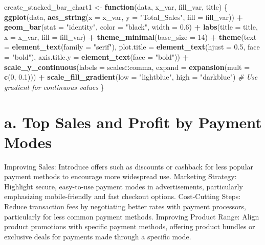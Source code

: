 \documentclass[
]{article}
\newenvironment{Shaded}{\begin{snugshade}}{\end{snugshade}}
\newcommand{\AttributeTok}[1]{\textcolor[rgb]{0.13,0.29,0.53}{#1}}
\newcommand{\CommentTok}[1]{\textcolor[rgb]{0.56,0.35,0.01}{\textit{#1}}}
\newcommand{\ControlFlowTok}[1]{\textcolor[rgb]{0.13,0.29,0.53}{\textbf{#1}}}
\newcommand{\DecValTok}[1]{\textcolor[rgb]{0.00,0.00,0.81}{#1}}
\newcommand{\FloatTok}[1]{\textcolor[rgb]{0.00,0.00,0.81}{#1}}
\newcommand{\FunctionTok}[1]{\textcolor[rgb]{0.13,0.29,0.53}{\textbf{#1}}}
\newcommand{\NormalTok}[1]{#1}
\newcommand{\OtherTok}[1]{\textcolor[rgb]{0.56,0.35,0.01}{#1}}
\newcommand{\SpecialCharTok}[1]{\textcolor[rgb]{0.81,0.36,0.00}{\textbf{#1}}}
\newcommand{\StringTok}[1]{\textcolor[rgb]{0.31,0.60,0.02}{#1}}
\begin{document}
\begin{Shaded}
\begin{Highlighting}[]
\NormalTok{create\_stacked\_bar\_chart1 }\OtherTok{\textless{}{-}} \ControlFlowTok{function}\NormalTok{(data, x\_var, fill\_var, title) \{}
  \FunctionTok{ggplot}\NormalTok{(data, }\FunctionTok{aes\_string}\NormalTok{(}\AttributeTok{x =}\NormalTok{ x\_var, }\AttributeTok{y =} \StringTok{"Total\_Sales"}\NormalTok{, }\AttributeTok{fill =}\NormalTok{ fill\_var)) }\SpecialCharTok{+} 
    \FunctionTok{geom\_bar}\NormalTok{(}\AttributeTok{stat =} \StringTok{"identity"}\NormalTok{, }\AttributeTok{color =} \StringTok{"black"}\NormalTok{, }\AttributeTok{width =} \FloatTok{0.6}\NormalTok{) }\SpecialCharTok{+} 
    \FunctionTok{labs}\NormalTok{(}\AttributeTok{title =}\NormalTok{ title, }\AttributeTok{x =}\NormalTok{ x\_var, }\AttributeTok{fill =}\NormalTok{ fill\_var) }\SpecialCharTok{+} 
    \FunctionTok{theme\_minimal}\NormalTok{(}\AttributeTok{base\_size =} \DecValTok{14}\NormalTok{) }\SpecialCharTok{+}
    \FunctionTok{theme}\NormalTok{(}\AttributeTok{text =} \FunctionTok{element\_text}\NormalTok{(}\AttributeTok{family =} \StringTok{"serif"}\NormalTok{),}
          \AttributeTok{plot.title =} \FunctionTok{element\_text}\NormalTok{(}\AttributeTok{hjust =} \FloatTok{0.5}\NormalTok{, }\AttributeTok{face =} \StringTok{"bold"}\NormalTok{),}
          \AttributeTok{axis.title.y =} \FunctionTok{element\_text}\NormalTok{(}\AttributeTok{face =} \StringTok{"bold"}\NormalTok{)) }\SpecialCharTok{+}
    \FunctionTok{scale\_y\_continuous}\NormalTok{(}\AttributeTok{labels =}\NormalTok{ scales}\SpecialCharTok{::}\NormalTok{comma, }\AttributeTok{expand =} \FunctionTok{expansion}\NormalTok{(}\AttributeTok{mult =} \FunctionTok{c}\NormalTok{(}\DecValTok{0}\NormalTok{, }\FloatTok{0.1}\NormalTok{))) }\SpecialCharTok{+}
    \FunctionTok{scale\_fill\_gradient}\NormalTok{(}\AttributeTok{low =} \StringTok{"lightblue"}\NormalTok{, }\AttributeTok{high =} \StringTok{"darkblue"}\NormalTok{)  }\CommentTok{\# Use gradient for continuous values}
\NormalTok{\}}
\end{Highlighting}
\end{Shaded}

\hypertarget{a.-top-sales-and-profit-by-payment-modes}{%
\section{a. Top Sales and Profit by Payment
Modes}\label{a.-top-sales-and-profit-by-payment-modes}}

Improving Sales: Introduce offers such as discounts or cashback for less
popular payment methods to encourage more widespread use. Marketing
Strategy: Highlight secure, easy-to-use payment modes in advertisements,
particularly emphasizing mobile-friendly and fast checkout options.
Cost-Cutting Steps: Reduce transaction fees by negotiating better rates
with payment processors, particularly for less common payment methods.
Improving Product Range: Align product promotions with specific payment
methods, offering product bundles or exclusive deals for payments made
through a specific mode.
\end{document}

